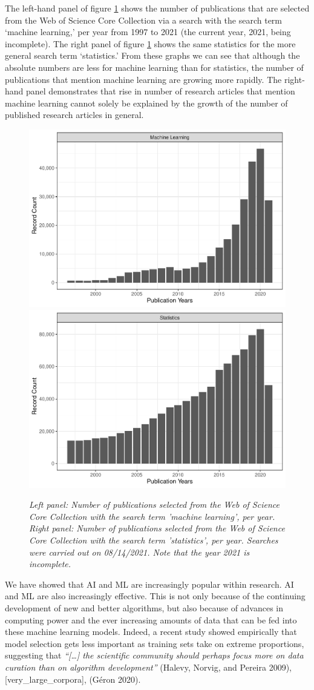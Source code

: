 \documentclass[
]{article}
\begin{document}
The left-hand panel of figure \ref{fig:wos} shows the number of publications that are selected from the Web of Science Core Collection via a search with the search term `machine learning,' per year from 1997 to 2021 (the current year, 2021, being incomplete). The right panel of figure \ref{fig:wos} shows the same statistics for the more general search term `statistics.' From these graphs we can see that although the absolute numbers are less for machine learning than for statistics, the number of publications that mention machine learning are growing more rapidly. The right-hand panel demonstrates that rise in number of research articles that mention machine learning cannot solely be explained by the growth of the number of published research articles in general.

\begin{figure}

{\centering \includegraphics[width=0.49\linewidth]{main_files/figure-latex/wos-1} \includegraphics[width=0.49\linewidth]{main_files/figure-latex/wos-2} 

}

\caption{\textit{Left panel: Number of publications selected from the Web of Science Core Collection with the search term 'machine learning', per year. Right panel: Number of publications selected from the Web of Science Core Collection with the search term 'statistics', per year. Searches were carried out on 08/14/2021. Note that the year 2021 is incomplete.}}\label{fig:wos}
\end{figure}

We have showed that AI and ML are increasingly popular within research. AI and ML are also increasingly effective. This is not only because of the continuing development of new and better algorithms, but also because of advances in computing power and the ever increasing amounts of data that can be fed into these machine learning models. Indeed, a recent study showed empirically that model selection gets less important as training sets take on extreme proportions, suggesting that \emph{``{[}\ldots{]} the scientific community should perhaps focus more on data curation than on algorithm development''} (Halevy, Norvig, and Pereira 2009), {[}very\_large\_corpora{]}, (Géron 2020).
\end{document}
